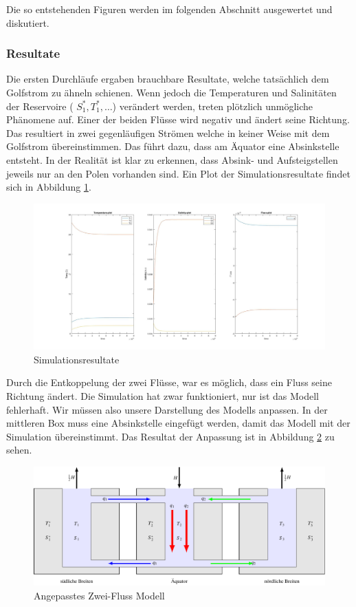 Die so entstehenden Figuren werden im folgenden Abschnitt ausgewertet und diskutiert. 

\subsubsection{Resultate}


Die ersten Durchläufe ergaben brauchbare Resultate, welche tatsächlich dem Golfstrom zu ähneln schienen. Wenn jedoch die Temperaturen und Salinitäten der Reservoire ( $S_1^*, T_1^*,\dots$) verändert werden, treten plötzlich unmögliche Phänomene auf.
Einer der beiden Flüsse wird negativ und ändert seine Richtung. Das resultiert in zwei gegenläufigen Strömen welche in keiner Weise mit dem Golfstrom übereinstimmen. Das führt dazu, dass am Äquator eine Absinkstelle entsteht. In der Realität ist klar zu erkennen, dass Absink- und Aufsteigstellen jeweils nur an den Polen vorhanden sind. 
Ein Plot der Simulationsresultate findet sich in Abbildung \ref{thermohalin:simulationsresultate}.

\begin{figure}
	\includegraphics[width=14cm]{thermohalin/Code/graphs/result-3b2f-script.jpg}
	\centering
	\caption{Simulationsresultate}
	\label{thermohalin:simulationsresultate}
\end{figure}

Durch die Entkoppelung der zwei Flüsse, war es möglich, dass ein Fluss seine Richtung ändert.
Die Simulation hat zwar funktioniert, nur ist das Modell fehlerhaft. Wir müssen also unsere Darstellung des Modells anpassen. In der mittleren Box muss eine Absinkstelle eingefügt werden, damit das Modell mit der Simulation übereinstimmt. Das Resultat der Anpassung ist in Abbildung \ref{thermohalin:3b2f-inverted} zu sehen.

\begin{figure}
	\centering
	\includegraphics[width=14cm]{thermohalin/tikz/3b2f-inverted.pdf}
	\caption{Angepasstes Zwei-Fluss Modell}
	\label{thermohalin:3b2f-inverted}
\end{figure}

